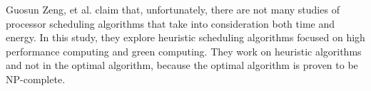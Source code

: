 Guosun Zeng, et al. \cite{EXE_METHOD} claim that, unfortunately, there are not many
studies of processor scheduling algorithms that take into consideration both
time and energy. In this study, they explore heuristic scheduling algorithms
focused on high performance computing and green computing. They work on
heuristic algorithms and not in the optimal algorithm, because the optimal
algorithm is proven to be NP-complete. 
